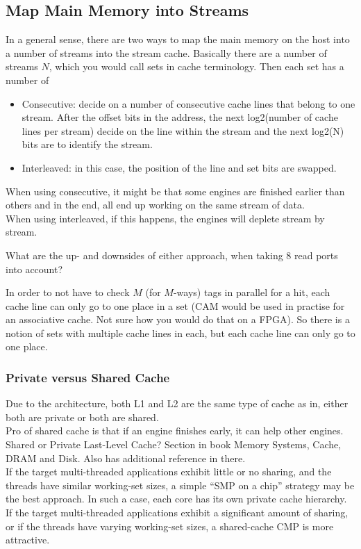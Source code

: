 \subsection{Map Main Memory into Streams}
In a general sense, there are two ways to map the main memory on the host into a number of streams into the stream cache. Basically there are a number of streams $N$, which you would call sets in cache terminology. Then each set has a number of
\begin{itemize}
	\item Consecutive: decide on a number of consecutive cache lines that belong to one stream. After the offset bits in the address, the next log2(number of cache lines per stream) decide on the line within the stream and the next log2(N) bits are to identify the stream.
	\item Interleaved: in this case, the position of the line and set bits are swapped.
\end{itemize}
When using consecutive, it might be that some engines are finished earlier than others and in the end, all end up working on the same stream of data.\\
When using interleaved, if this happens, the engines will deplete stream by stream.

What are the up- and downsides of either approach, when taking 8 read ports into account?

In order to not have to check $M$ (for $M$-ways) tags in parallel for a hit, each cache line can only go to one place in a set (CAM would be used in practise for an associative cache. Not sure how you would do that on a FPGA). So there is a notion of sets with multiple cache lines in each, but each cache line can only go to one place.

\subsubsection{Private versus Shared Cache}
Due to the architecture, both L1 and L2 are the same type of cache as in, either both are private or both are shared.\\

Pro of shared cache is that if an engine finishes early, it can help other engines.\\

Shared or Private Last-Level Cache? Section in book Memory Systems, Cache, DRAM and Disk. Also has additional reference in there.\\
If the target multi-threaded applications exhibit little or no sharing, and the threads have similar working-set sizes, a simple “SMP on a chip” strategy may be the best approach. In such a case, each core has its own private cache hierarchy.\\
If the target multi-threaded applications exhibit a significant amount of sharing, or if the threads have varying working-set sizes, a shared-cache CMP is more attractive.\\









